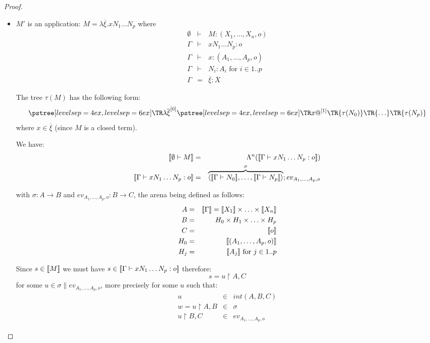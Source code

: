 \begin{proof}
\begin{itemize}
\begin{itemize}
    \item $M'$ is an application: $M = \lambda \overline{\xi} . x N_1 \ldots N_p$ where
    \begin{eqnarray*}
    \emptyset &\vdash& M : (X_1,\ldots,X_n,o) \\
    \Gamma &\vdash& x N_1 \ldots N_p : o \\
    \Gamma &\vdash& x : (A_1,\ldots,A_p,o) \\
    \Gamma &\vdash& N_i : A_i \mbox{ for } i \in 1..p \\
    \Gamma &=& \overline{\xi} : \overline{X}
    \end{eqnarray*}

    The tree $\tau(M)$ has the following form:
    $$ \tree[levelsep=6ex]{\lambda \overline{\xi}^{[0]}}
        { \tree[levelsep=6ex]{x @^{[1]}}
            {   \TR{\tau(N_0)} \TR{\ldots} \TR{\tau(N_p)}}}
    $$
    where $x \in \overline{\xi}$ (since $M$ is a closed term).

    We have:
    \begin{eqnarray*}
    \sem{ \emptyset \vdash M} &=& \Lambda^n( \sem{\Gamma \vdash x N_1 \ldots N_p : o} ) \\
    \sem{\Gamma \vdash x N_1 \ldots N_p : o} &=& \overbrace{\langle \sem{\Gamma \vdash N_0}, \ldots, \sem{\Gamma \vdash N_p} \rangle}^\sigma ; ev_{A_1,\ldots,A_p,o}
    \end{eqnarray*}

    with $\sigma : A \longrightarrow B$ and $ev_{A_1,\ldots,A_p,o} : B \longrightarrow C$, the arena being defined as follows:
    \begin{eqnarray*}
        A &=& \sem{\Gamma} = \sem{X_1} \times \ldots \times \sem{X_n}\\
        B &=& H_0 \times H_1 \times \ldots \times H_p \\
        C &=& \sem{o}\\
        H_0 &=& \sem{(A_1,\ldots,A_p,o)} \\
        H_j &=& \sem{A_j} \mbox{ for }j \in 1..p
    \end{eqnarray*}

    Since $s \in {[\![M ]\!]}$ we must have $s\in {[\![\Gamma \vdash x N_1 \ldots N_p : o ]\!]}$ therefore:
    \begin{equation}
        s = u \upharpoonright A, C \label{eq:def_s}
    \end{equation}
    for some $u \in \sigma \parallel ev_{A_1,\ldots,A_p,o}$, more precisely for some $u$ such that:
    \begin{eqnarray}
        u &\in& int(A,B,C) \nonumber \\
        w = u \upharpoonright A,B & \in& \sigma       \label{eq:def_w}\\
        u \upharpoonright B,C & \in & ev_{A_1,\ldots,A_p,o} \nonumber
    \end{eqnarray}


\end{itemize}
\end{itemize}
\end{proof}
